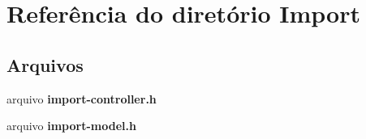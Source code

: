 \section{Referência do diretório Import}
\label{dir_f55e5434800f6f710e4300e6d7f1a185}
\subsection*{Arquivos}
\begin{DoxyCompactItemize}
\item 
arquivo {\bf import-\/controller.\+h}
\item 
arquivo {\bf import-\/model.\+h}
\end{DoxyCompactItemize}
